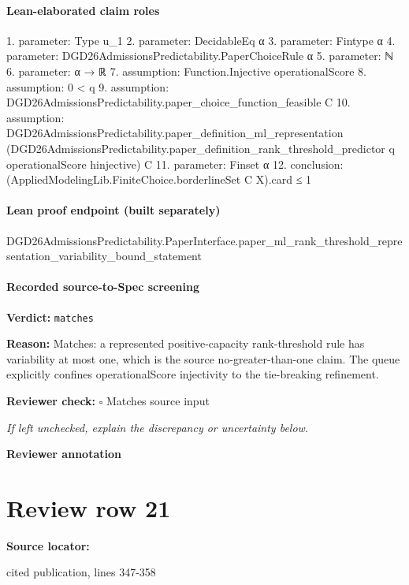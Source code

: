 \documentclass[10pt]{article}
\newcommand{\reviewerbox}{%
  \par\noindent\fbox{\parbox{0.96\linewidth}{\rule{0pt}{0.38in}}}\par
}
\newcommand{\reviewmatch}[1]{%
  \par\noindent\textbf{Reviewer check:} $\square$\; #1\par
  \noindent\emph{If left unchecked, explain the discrepancy or uncertainty below.}\par
}
\begin{document}
\paragraph{Lean-elaborated claim roles}\begin{ReviewVerbatim}
1. parameter: Type u_1
2. parameter: DecidableEq α
3. parameter: Fintype α
4. parameter: DGD26AdmissionsPredictability.PaperChoiceRule α
5. parameter: ℕ
6. parameter: α → ℝ
7. assumption: Function.Injective operationalScore
8. assumption: 0 < q
9. assumption: DGD26AdmissionsPredictability.paper_choice_function_feasible C
10. assumption: DGD26AdmissionsPredictability.paper_definition_ml_representation
  (DGD26AdmissionsPredictability.paper_definition_rank_threshold_predictor q operationalScore hinjective) C
11. parameter: Finset α
12. conclusion: (AppliedModelingLib.FiniteChoice.borderlineSet C X).card ≤ 1
\end{ReviewVerbatim}

\paragraph{Lean proof endpoint (built separately)}\begin{ReviewVerbatim}
DGD26AdmissionsPredictability.PaperInterface.paper_ml_rank_threshold_representation_variability_bound_statement
\end{ReviewVerbatim}

\paragraph{Recorded source-to-Spec screening}
\textbf{Verdict:} \texttt{matches}
\\
{\raggedright
\textbf{Reason:} Matches:\allowbreak{} a represented positive-\allowbreak{}capacity rank-\allowbreak{}threshold rule has variability at most one, which is the source no-\allowbreak{}greater-\allowbreak{}than-\allowbreak{}one claim.\allowbreak{} The queue explicitly confines operationalScore injectivity to the tie-\allowbreak{}breaking refinement.\allowbreak{}
\par}
\reviewmatch{Matches source input}
\noindent\textbf{Reviewer annotation}\par
\reviewerbox
\clearpage
\hypertarget{source-claim-396063f8f4209701}{}
\section*{Review row 21}
\textbf{Source locator:} {\footnotesize\raggedright cited publication, lines 347-\allowbreak{}358\par}
\end{document}
